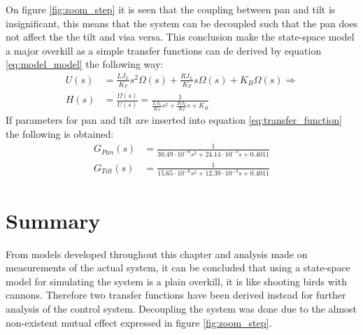 On figure \ref{fig:zoom_step} it is seen that the coupling between pan and tilt is insignificant, this means that the system can be decoupled such that the pan does not affect the the tilt and visa versa. This conclusion make the state-space model a major overkill as a simple transfer functions can de derived by equation \ref{eq:model_model} the following way:
\begin{align}
	U(s) &= \frac{L J_L}{K_T} s^2 \Omega(s) + \frac{R J_L}{K_T} s \Omega(s) + K_B \Omega(s) \Rightarrow\\
	H(s) &= \frac{\Omega(s)}{U(s)} = \frac{1}{\frac{L J_L}{K_T} s^2 + \frac{R J_L}{K_T} s + K_B}\label{eq:transfer_function}
\end{align}
If parameters for pan and tilt are inserted into equation \ref{eq:transfer_function} the following is obtained:
\begin{align}
	G_{Pan}(s) &= \frac{1}{30.49 \cdot 10^{-6} s^2 + 24.14 \cdot 10^{-3} s + 0.4011}\label{eq:transfer_function_pan}\\
	G_{Tilt}(s) &= \frac{1}{15.65 \cdot 10^{-6} s^2 + 12.39 \cdot 10^{-3} s + 0.4011}\label{eq:transfer_function_tilt}
\end{align}

\section{Summary}
From models developed throughout this chapter and analysis made on measurements of the actual system, it can be concluded that using a state-space model for simulating the system is a plain overkill, it is like shooting birds with cannons. Therefore two transfer functions have been derived instead for further analysis of the control system. Decoupling the system was done due to the almost non-existent mutual effect expressed in figure \ref{fig:zoom_step}. 